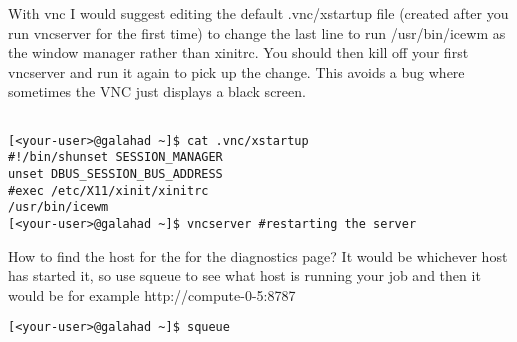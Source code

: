 \documentclass[english]{article}
\begin{document}
With vnc I would suggest editing the default .vnc/xstartup file 
(created after you run vncserver for the first time) to change the last line to run /usr/bin/icewm as the window manager rather than xinitrc.
You should then kill off your first vncserver and run it again to pick up the change.
This avoids a bug where sometimes the VNC just displays a black screen.

\begin{verbatim}

[<your-user>@galahad ~]$ cat .vnc/xstartup
#!/bin/shunset SESSION_MANAGER
unset DBUS_SESSION_BUS_ADDRESS
#exec /etc/X11/xinit/xinitrc
/usr/bin/icewm
[<your-user>@galahad ~]$ vncserver #restarting the server
\end{verbatim}
How to find the host for the for the diagnostics page? It would be whichever host has started it, so
use squeue to see what host is running your job and then it would be for example http://compute-0-5:8787


\begin{verbatim}
[<your-user>@galahad ~]$ squeue

\end{verbatim}
\end{document}
